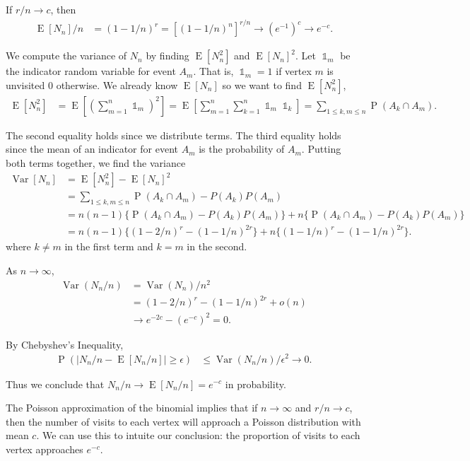 \documentclass[12pt]{article}
\theoremstyle{definition}
\DeclareMathOperator{\E}{\mathrm{E}}		     %
\DeclareMathOperator{\Var}{\mathrm{Var}}         %
\DeclareMathOperator{\I}{\mathbb{1}}             %
\DeclareMathOperator{\pr}{\mathrm{P}}		     %
\begin{document}
If $r/n \rightarrow c$, then
\begin{align}
\E[N_n]/n &= (1-1/n)^r = [(1-1/n)^n]^{r/n} \rightarrow (e^{-1})^c
\rightarrow e^{-c}. \nonumber
\end{align}

We compute the variance of $N_n$ by finding $\E[N_n^2]$ and $\E[N_n]^2$.
Let $\I_m$ be the indicator random variable for event $A_m$.
That is, $\I_m = 1$ if vertex $m$ is unvisited 0 otherwise.
We already know $\E[N_n]$ so we want to find $\E[N_n^2]$,
\begin{align}
\E[N_n^2] &= \E \left[ \left(\sum_{m=1}^n \I_m \right) ^2 \right] =
\E \left[ \sum_{m=1}^n \sum_{k=1}^n \I_m \I_k \right] =
\sum_{1 \leq k, m \leq n} \pr(A_k \cap A_m). \nonumber
\end{align}

The second equality holds since we distribute terms.
The third equality holds since the mean of an indicator for event $A_m$
is the probability of $A_m$.
Putting both terms together, we find the variance
\begin{align}
\Var[N_n] &= \E[N_n^2] - \E[N_n]^2 \nonumber \\
&= \sum_{1 \leq k, m \leq n} \pr(A_k \cap A_m) - P(A_k)P(A_m) \nonumber \\
&= n(n-1) \{ \pr(A_k \cap A_m) - P(A_k)P(A_m) \} + 
n \{ \pr(A_k \cap A_m) - P(A_k)P(A_m) \} \nonumber \\
&= n(n-1) \{ (1-2/n)^r - (1-1/n)^{2r} \} + 
n \{ (1-1/n)^r  - (1-1/n)^{2r} \}. \nonumber
\end{align}
where $k\neq m$ in the first term and $k=m$ in the second.

As $n \rightarrow \infty$,
\begin{align}
\Var(N_n/n) &= \Var(N_n) / n^2 \nonumber\\
&= (1-2/n)^r - (1-1/n)^{2r} + o(n) \nonumber\\
&\rightarrow e^{-2c} - (e^{-c})^2 = 0. \nonumber
\end{align}

By Chebyshev's Inequality,
\begin{align}
\pr \left( |N_n/n - \E[N_n/n]| \geq \epsilon \right) &\leq \Var(N_n/n) / \epsilon^2
\rightarrow 0. \nonumber
\end{align}

Thus we conclude that $N_n/n \rightarrow \E[N_n/n] = e^{-c}$ in probability. 

The Poisson approximation of the binomial implies that if $n \rightarrow \infty$
and $r/n \rightarrow c$, then the number of visits to each vertex will approach
a Poisson distribution with mean $c$.
We can use this to intuite our conclusion: the proportion of visits to each vertex
approaches $e^{-c}$.
\end{document}

